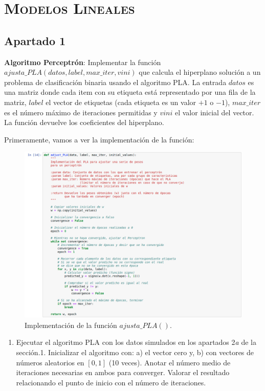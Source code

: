 \documentclass[11pt,a4paper]{article}
\begin{document}
\section{\textsc{Modelos Lineales}}

\subsection*{Apartado 1}

\noindent \textbf{Algoritmo Perceptrón}: Implementar la función
$ajusta\_PLA(datos, label, max\_iter, vini)$ que calcula el hiperplano solución a un problema de
clasificación binaria usando el algoritmo PLA. La entrada $datos$ es una matriz donde cada item con
su etiqueta está representado por una fila de la matriz, $label$ el vector de etiquetas (cada etiqueta
es un valor $+1$ o $-1$), $max\_iter$ es el número máximo de iteraciones permitidas y $vini$ el valor
inicial del vector. La función devuelve los coeficientes del hiperplano.

Primeramente, vamos a ver la implementación de la función:

\begin{figure}[H]
\centering
\includegraphics[scale=0.4]{img/adjust_pla.png}
\caption{Implementación de la función $ajusta\_PLA()$.}
\end{figure}

\begin{enumerate}[label=\textit{\alph*})]
	\item Ejecutar el algoritmo PLA con los datos simulados en los apartados 2\textit{a} de la
	sección.1. Inicializar el algoritmo con: a) el vector cero y, b) con vectores de números
	aleatorios en $[0, 1]$ (10 veces). Anotar el número medio de iteraciones necesarias en ambos para
	converger. Valorar el resultado relacionando el punto de inicio con el número de iteraciones.
\end{enumerate}
\end{document}
